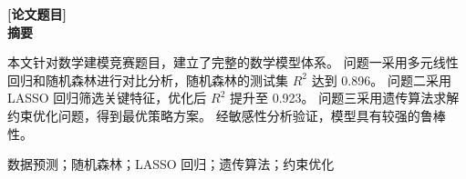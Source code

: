 \begin{center}
  {\fontsize{14pt}{16.8pt}\bfseries [论文题目]}\\[0.65em]
  {\fontsize{14pt}{16.8pt}\bfseries 摘\quad 要}
\end{center}

本文针对数学建模竞赛题目，建立了完整的数学模型体系。
问题一采用多元线性回归和随机森林进行对比分析，随机森林的测试集 $R^2$ 达到 0.896。
问题二采用 LASSO 回归筛选关键特征，优化后 $R^2$ 提升至 0.923。
问题三采用遗传算法求解约束优化问题，得到最优策略方案。
经敏感性分析验证，模型具有较强的鲁棒性。

\vspace{0.6em}

数据预测；随机森林；LASSO 回归；遗传算法；约束优化

\newpage
